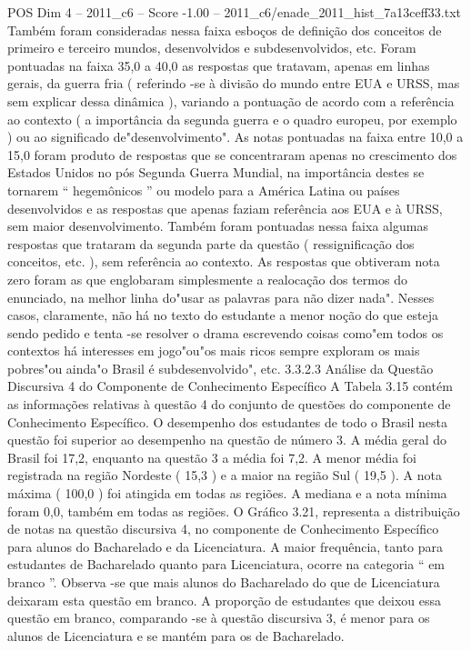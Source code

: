\begin{textsample}{POS Dim 4 – 2011\_c6 – Score -1.00 – 2011\_c6/enade\_2011\_hist\_7a13ceff33.txt}
Também foram consideradas nessa faixa esboços de definição dos conceitos de primeiro e terceiro mundos, desenvolvidos e subdesenvolvidos, etc.
Foram pontuadas na faixa 35,0 a 40,0 as respostas que tratavam, apenas em linhas gerais, da guerra fria ( referindo -se à divisão do mundo entre EUA e URSS, mas sem explicar dessa dinâmica ), variando a pontuação de acordo com a referência ao contexto ( a importância da segunda guerra e o quadro europeu, por exemplo ) ou ao significado de"desenvolvimento".
As notas pontuadas na faixa entre 10,0 a 15,0 foram produto de respostas que se concentraram apenas no crescimento dos Estados Unidos no pós Segunda Guerra Mundial, na importância destes se tornarem “ hegemônicos ” ou modelo para a América Latina ou países desenvolvidos e as respostas que apenas faziam referência aos EUA e à URSS, sem maior desenvolvimento.
Também foram pontuadas nessa faixa algumas respostas que trataram da segunda parte da questão ( ressignificação dos conceitos, etc. ), sem referência ao contexto.
As respostas que obtiveram nota zero foram as que englobaram simplesmente a realocação dos termos do enunciado, na melhor linha do"usar as palavras para não dizer nada".
Nesses casos, claramente, não há no texto do estudante a menor noção do que esteja sendo pedido e tenta -se resolver o drama escrevendo coisas como"em todos os contextos há interesses em jogo"ou"os mais ricos sempre exploram os mais pobres"ou ainda"o Brasil é subdesenvolvido", etc. 3.3.2.3 Análise da Questão Discursiva 4 do Componente de Conhecimento Específico A Tabela 3.15 contém as informações relativas à questão 4 do conjunto de questões do componente de Conhecimento Específico.
O desempenho dos estudantes de todo o Brasil nesta questão foi superior ao desempenho na questão de número 3.
A média geral do Brasil foi 17,2, enquanto na questão 3 a média foi 7,2.
A menor média foi registrada na região Nordeste ( 15,3 ) e a maior na região Sul ( 19,5 ).
A nota máxima ( 100,0 ) foi atingida em todas as regiões.
A mediana e a nota mínima foram 0,0, também em todas as regiões.
O Gráfico 3.21, representa a distribuição de notas na questão discursiva 4, no componente de Conhecimento Específico para alunos do Bacharelado e da Licenciatura.
A maior frequência, tanto para estudantes de Bacharelado quanto para Licenciatura, ocorre na categoria “ em branco ”.
Observa -se que mais alunos do Bacharelado do que de Licenciatura deixaram esta questão em branco.
A proporção de estudantes que deixou essa questão em branco, comparando -se à questão discursiva 3, é menor para os alunos de Licenciatura e se mantém para os de Bacharelado.

\end{textsample}
